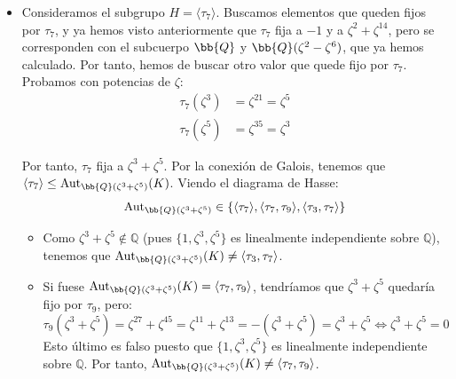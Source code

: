 \begin{ejemplo}
\begin{itemize}
\begin{itemize}
            Queremos calcular $[\bb{Q}(\zeta^2):\mathbb{Q}]$. Como $\zeta$ es una raíz decimosexta primitiva de la unidad, tenemos que $\zeta^2$ es una raíz octava primitiva de la unidad, y por tanto:
            \begin{equation*}
                [\bb{Q}(\zeta^2):\mathbb{Q}] = \varphi(8) = 4
            \end{equation*}

            Como $[K^{\langle \tau_9\rangle}:\mathbb{Q}] = 4$, tenemos que:
            \begin{equation*}
                K^{\langle \tau_9\rangle} = \bb{Q}(\zeta^2)
            \end{equation*}
            \item Consideramos el subgrupo $H = \langle \tau_7\rangle$. Buscamos elementos que queden fijos por $\tau_7$, y ya hemos visto anteriormente que $\tau_7$ fija a $-1$ y a $\zeta^2+\zeta^{14}$, pero se corresponden con el subcuerpo $\bb{Q}$ y $\bb{Q}(\zeta^2-\zeta^6)$, que ya hemos calculado. Por tanto, hemos de buscar otro valor que quede fijo por $\tau_7$. Probamos con potencias de $\zeta$:
            \begin{align*}
                \tau_7(\zeta^3) &= \zeta^{21} = \zeta^5 \\
                \tau_7(\zeta^5) &= \zeta^{35} = \zeta^{3}
            \end{align*}

            Por tanto, $\tau_7$ fija a $\zeta^3+\zeta^5$. Por la conexión de Galois, tenemos que $\langle \tau_7\rangle\leq \Aut_{\bb{Q}(\zeta^3+\zeta^5)}(K)$. Viendo el diagrama de Hasse:
            \begin{equation*}
                \Aut_{\bb{Q}(\zeta^3+\zeta^5)} \in \{\langle \tau_7\rangle, \langle \tau_7, \tau_9\rangle, \langle \tau_3, \tau_7\rangle\}
            \end{equation*}
            \begin{itemize}
                \item Como $\zeta^3+\zeta^5\notin \mathbb{Q}$ (pues $\{1,\zeta^3,\zeta^{5}\}$ es linealmente independiente sobre $\mathbb{Q}$), tenemos que $\Aut_{\bb{Q}(\zeta^3+\zeta^5)}(K)\neq \langle \tau_3, \tau_7\rangle$.
                \item Si fuese $\Aut_{\bb{Q}(\zeta^3+\zeta^5)}(K) = \langle \tau_7, \tau_9\rangle$, tendríamos que $\zeta^3+\zeta^5$ quedaría fijo por $\tau_9$, pero:
                \begin{equation*}
                    \tau_9(\zeta^3+\zeta^5) = \zeta^{27}+\zeta^{45} = \zeta^{11}+\zeta^{13} = -(\zeta^3+\zeta^5)= \zeta^3+\zeta^5\iff \zeta^3+\zeta^5 = 0
                \end{equation*}
                Esto último es falso puesto que $\{1,\zeta^3,\zeta^5\}$ es linealmente independiente sobre $\mathbb{Q}$. Por tanto, $\Aut_{\bb{Q}(\zeta^3+\zeta^5)}(K)\neq \langle \tau_7, \tau_9\rangle$.
            \end{itemize}


\end{itemize}
\end{itemize}
\end{ejemplo}
